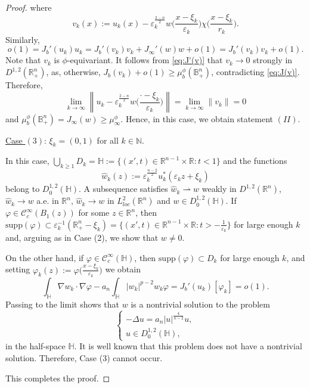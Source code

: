 \documentclass[10pt,a4paper]{amsart}
\def\D{\mathbb{B}^n_+}
\def\cC{\mathcal{C}}
\def\eps{\varepsilon}
\def\hn{\mathbb{R}^n_+}
\def\n{\mathbb{N}}
\def\rh{\rightharpoonup}
\def\rn{\mathbb{R}^n}
\def\r{\mathbb{R}}
\def\supp{\mathrm{supp}}
\def\vp{\varphi}
\def\what{\widehat}
\begin{document}
\begin{proof}
where
$$v_k(x):=u_k(x)-\eps_k^\frac{2-n}{2}w\Big(\frac{x-\xi_k}{\eps_k}\Big)\chi\Big(\frac{x-\xi_k}{r_k}\Big).$$
Similarly,
\begin{equation}\label{eq:J'(v)}
o(1)=J_b'(u_k)u_k=J_b'(v_k)v_k + J_\infty'(w)w + o(1)=J_b'(v_k)v_k + o(1).
\end{equation}
Note that $v_k$ is $\phi$-equivariant. It follows from \eqref{eq:J'(v)} that $v_k\to 0$ strongly in $D^{1,2}(\hn)$, as, otherwise, $J_b(v_k)+o(1)\geq\mu_b^\phi(\D)$, contradicting \eqref{eq:J(v)}. Therefore, 
$$\lim_{k\to\infty}\left\|u_k-\eps_k^\frac{2-n}{2}w\Big(\frac{\cdot - \xi_k}{\eps_k}\Big)\right\| = \lim_{k\to\infty}\|v_k\| = 0$$
and $\mu^\phi_b(\D)=J_\infty(w)\geq \mu^\phi_\infty$. Hence, in this case, we obtain statement $(II)$.

\underline{Case $(3)$}: $\xi_k=(0,1)$ for all $k\in\n$.

In this case, $\bigcup_{k\geq 1}D_k=\mathbb{H}:=\{(x',t)\in\r^{n-1}\times\r:t<1\}$ and the functions 
$$\what w_k(z):=\eps_k^\frac{n-2}{2}u_k^*(\eps_kz+\xi_k)$$
belong to $D^{1,2}_0(\mathbb{H})$. A subsequence satisfies $\what w_k\rh w$ weakly in $D^{1,2}(\rn)$, $\what w_k\to w$ a.e. in $\rn$, $\what w_k\to w$ in $L^2_{loc}(\rn)$ and $w\in D^{1,2}_0(\mathbb{H})$. If $\vp\in\cC^\infty_c(B_1(z))$ for some $z\in\rn$, then $\supp(\vp)\subset \eps_k^{-1}(\hn-\xi_k)=\{(x',t)\in\r^{n-1}\times\r:t>-\frac{1}{\eps_k}\} $ for large enough $k$ and, arguing as in Case (2), we show that $w\neq 0$.

On the other hand, if $\vp\in\cC_c^\infty(\mathbb{H})$, then $\supp(\vp)\subset D_k$ for large enough $k$, and setting $\vp_k(z):=\vp\big(\frac{x-\xi_k}{\eps_k}\big)$ we obtain
\begin{equation*}
\int_\mathbb{H}\nabla w_k\cdot\nabla\vp-a_n\int_\mathbb{H}|w_k|^{p-2}w_k\vp = J_b'(u_k)[\vp_k]=o(1).
\end{equation*}
Passing to the limit shows that $w$ is a nontrivial solution to the problem 
\begin{equation*}
\begin{cases}
 -\Delta u = a_n|u|^\frac{4}{n-2}u,\\
 u\in D^{1,2}_0(\mathbb{H}),
\end{cases}
\end{equation*}
in the half-space $\mathbb{H}$. It is well known that this problem does not have a nontrivial solution. Therefore, Case (3) cannot occur.

This completes the proof.
\end{proof}
\end{document}
